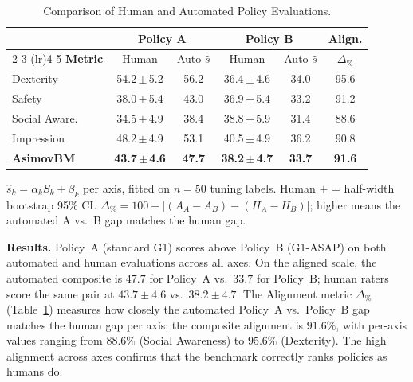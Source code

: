 \documentclass[conference]{IEEEtran}
\begin{document}
\begin{table}[!ht]
	\centering
	\caption{Comparison of Human and Automated Policy Evaluations.}
	\label{tab:metrics}
	\footnotesize
	\begin{tabular}{lccccc}
		\toprule
		& \multicolumn{2}{c}{\textbf{Policy A}} & \multicolumn{2}{c}{\textbf{Policy B}} & \textbf{Align.} \\
		\cmidrule(lr){2-3} \cmidrule(lr){4-5}
		\textbf{Metric}   & {Human}              & {Auto $\hat{s}$}  & {Human}              & {Auto $\hat{s}$} & {$\Delta_{\%}$} \\
		\midrule
		Dexterity         & 54.2\,$\pm$\,5.2     & 56.2              & 36.4\,$\pm$\,4.6     & 34.0             & 95.6 \\
		Safety            & 38.0\,$\pm$\,5.4     & 43.0              & 36.9\,$\pm$\,5.4     & 33.2             & 91.2 \\
		Social Aware.     & 34.5\,$\pm$\,4.9     & 38.4              & 38.8\,$\pm$\,5.9     & 31.4             & 88.6 \\
		Impression        & 48.2\,$\pm$\,4.9     & 53.1              & 40.5\,$\pm$\,4.9     & 36.2             & 90.8 \\
		\midrule
		\textbf{AsimovBM} & \textbf{43.7\,$\pm$\,4.6} & \textbf{47.7} & \textbf{38.2\,$\pm$\,4.7} & \textbf{33.7} & \textbf{91.6} \\
		\bottomrule
	\end{tabular}
	\begin{flushleft}
		\scriptsize
		$\hat{s}_k = \alpha_k S_k + \beta_k$ per axis, fitted on $n{=}50$ tuning labels.
		Human $\pm$ = half-width bootstrap 95\% CI\@.
		$\Delta_{\%} = 100 - |(A_A - A_B) - (H_A - H_B)|$; higher means the automated A vs.\ B gap matches the human gap.
	\end{flushleft}
\end{table}

\textbf{Results.}
Policy~A (standard G1) scores above Policy~B (G1-ASAP) on both automated and
human evaluations across all axes.
On the aligned scale, the automated composite is $47.7$ for Policy~A vs.\ $33.7$
for Policy~B; human raters score the same pair at $43.7\!\pm\!4.6$ vs.\
$38.2\!\pm\!4.7$.
The Alignment metric $\Delta_\%$ (Table~\ref{tab:metrics}) measures how closely
the automated Policy~A vs.\ Policy~B gap matches the human gap per axis; the
composite alignment is $91.6\%$, with per-axis values ranging from $88.6\%$
(Social Awareness) to $95.6\%$ (Dexterity).
The high alignment across axes confirms that the benchmark correctly ranks
policies as humans do. %
\end{document}

